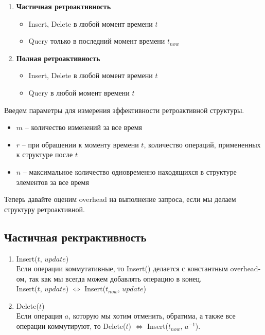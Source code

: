\begin{enumerate}

\item {\bf Частичная ретроактивность}

\begin{itemize}

\item Insert, Delete в любой момент времени $t$
\item Query только в последний момент времени $t_{now}$

\end{itemize}

\item {\bf Полная ретроактивность}

\begin{itemize}

\item Insert, Delete в любой момент времени $t$
\item Query в любой момент времени $t$

\end{itemize}

\end{enumerate}

Введем параметры для измерения эффективности ретроактивной структуры.

\begin{itemize}

\item $m$ -- количество изменений за все время
\item $r$ -- при обращении к моменту времени $t$, количество операций, примененных к структуре после $t$
\item $n$ -- максимальное количество одновременно находящихся в структуре элементов за все время

\end{itemize}

Теперь давайте оценим overhead на выполнение запроса, если мы делаем структуру ретроактивной.

\subsection*{Частичная ректрактивность}

\begin{enumerate}

\item Insert($t$, $update$)\\ 
Если операции коммутативные, то Insert() делается с константным overhead-ом, так как мы всегда можем добавлять операцию в конец.\\
Insert($t$, $update$) $\Leftrightarrow$ Insert($t_{now}$, $update$)

\item Delete($t$)\\
Если операция $a$, которую мы хотим отменить, обратима, а также все операции коммутируют, то Delete($t$) $\Leftrightarrow$ Insert($t_{now}$, $a^{-1}$).

\end{enumerate}

